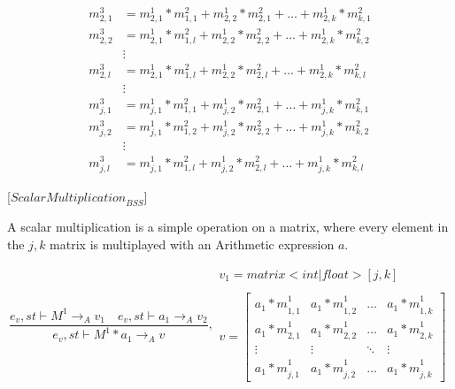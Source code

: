 \begin{minipage}{1.0\textwidth}
\begin{equation*}
\begin{aligned}
{ { m }_{ 2,1 }^{ 3 } }  &= { { m }_{ 2,1 }^{ 1 } } *{ { m }_{ 1,1 }^{ 2 } }+ { { m }_{ 2,2 }^{ 1 } } *{ { m }_{ 2,1 }^{ 2 } }+\dots+ { { m }_{ 2,k }^{ 1 } } *{ { m }_{ k,1 }^{ 2 } }\\
{ { m }_{ 2,2 }^{ 3 } }  &= { { m }_{ 2,1 }^{ 1 } } *{ { m }_{ 1,l }^{ 2 } }+ { { m }_{ 2,2 }^{ 1 } } *{ { m }_{ 2,2 }^{ 2 } }+\dots+ { { m }_{ 2,k }^{ 1 } } *{ { m }_{ k,2 }^{ 2 } }\\
&\vdots\\
{ { m }_{ 2,l }^{ 3 } }  &= { { m }_{ 2,1 }^{ 1 } } *{ { m }_{ 1,l }^{ 2 } }+ { { m }_{ 2,2 }^{ 1 } } *{ { m }_{ 2,l }^{ 2 } }+\dots+ { { m }_{ 2,k }^{ 1 } } *{ { m }_{ k,l }^{ 2 } }\\
&\vdots\\
{ { m }_{ j,1 }^{ 3 } }  &= { { m }_{ j,1 }^{ 1 } } *{ { m }_{ 1,1 }^{ 2 } }+ { { m }_{ j,2 }^{ 1 } } *{ { m }_{ 2,1 }^{ 2 } }+\dots+ { { m }_{ j,k }^{ 1 } } *{ { m }_{ k,1 }^{ 2 } }\\
{ { m }_{ j,2 }^{ 3 } }  &= { { m }_{ j,1 }^{ 1 } } *{ { m }_{ 1,2 }^{ 2 } }+ { { m }_{ j,2 }^{ 1 } } *{ { m }_{ 2,2 }^{ 2 } }+\dots+ { { m }_{ j,k }^{ 1 } } *{ { m }_{ k,2 }^{ 2 } }\\
&\vdots\\
{ { m }_{ j,l }^{ 3 } }  &= { { m }_{ j,1 }^{ 1 } } *{ { m }_{ 1,l }^{ 2 } }+ { { m }_{ j,2 }^{ 1 } } *{ { m }_{ 2,l }^{ 2 } }+\dots+ { { m }_{ j,k }^{ 1 } } *{ { m }_{ k,l }^{ 2 } }
\end{aligned}
\end{equation*}
\end{minipage}\newline


\newpage

[${ScalarMultiplication}_{BSS}$]

A scalar multiplication is a simple operation on a matrix, where every element in the $j,k$ matrix is multiplayed with an Arithmetic expression $a$. 

\begin{equation}
	\frac { { e }_{ v },st\vdash { M }^{ 1 }{ \rightarrow  }_{ A }{ v }_{ 1 }\quad { e }_{ v },st\vdash { a }_{ 1 }{ \rightarrow  }_{ A }{ v }_{ 2 } }{ { e }_{ v },st\vdash { M }^{ 1 }\ast { a }_{ 1 }{ \rightarrow  }_{ A }{ v } } ,\begin{matrix} { v }_{ 1 }=matrix<int|float>[j,k] \\  \\ v=\begin{bmatrix} { { a }_{ 1 }*m }_{ 1,1 }^{ 1 } & { { a }_{ 1 }*m }_{ 1,2 }^{ 1 } & \dots  & { { a }_{ 1 }*m }_{ 1,k }^{ 1 } \\ { { a }_{ 1 }*m }_{ 2,1 }^{ 1 } & { { a }_{ 1 }*m }_{ 2,2 }^{ 1 } & \dots  & { { a }_{ 1 }*m }_{ 2,k }^{ 1 } \\ \vdots  & \vdots  & \ddots  & \vdots  \\ { { a }_{ 1 }*m }_{ j,1 }^{ 1 } & { { a }_{ 1 }*m }_{ j,2 }^{ 1 } & \dots  & { { a }_{ 1 }*m }_{ j,k }^{ 1 } \end{bmatrix} \end{matrix}
\end{equation}
